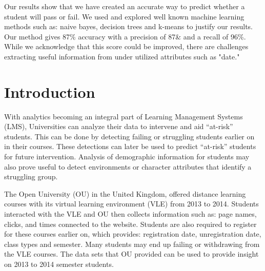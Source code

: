 \documentclass[12pt]{article}
\begin{document}
Our results show that we have created an accurate way to predict whether a student will pass or fail. We used and explored well known machine learning methods such as: naive bayes, decision trees and k-means to justify our results. Our method gives 87\% accuracy with a precision of 87\& and a recall of 96\%. While we acknowledge that this score could be improved, there are challenges extracting useful information from under utilized attributes such as "date." 

%
%

\section{Introduction}

With analytics becoming an integral part of Learning Management Systems (LMS), Universities can analyze their data to intervene and aid ``at-risk'' 
students. This can be done by detecting failing or struggling students earlier on in their courses. These detections can later be used to predict ``at-risk''
students for future intervention. Analysis of demographic information for students may also prove useful to detect environments or character
attributes that identify a struggling group.

The Open University (OU) in the United Kingdom, offered distance learning courses with its virtual learning environment (VLE) from 2013 to 2014. Students interacted with 
the VLE and OU then collects information such as: page names, clicks, and times connected to the website. Students are also required to register for these 
courses earlier on, which provides: registration date, unregistration date, class types and semester. Many students may end up failing or withdrawing from the VLE 
courses. The data sets that OU provided can be used to provide insight on 2013 to 2014 semester students. 
\end{document}
